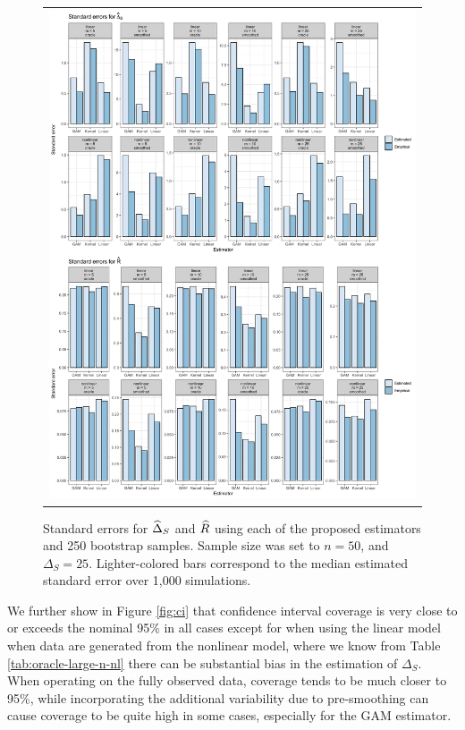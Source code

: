 \documentclass[useAMS,usenatbib,referee]{biom}
\begin{document}
\begin{figure}
\centering
\begin{tabular}{c}
\includegraphics[width =\textwidth]{results/standard-error-figure.png}
\end{tabular}\vspace{0.2in}
\caption{Standard errors for ${\widehat\Delta}_S$ and ${\widehat R}$ using each of the proposed estimators and 250 bootstrap samples. Sample size was set to $n = 50$, and $\Delta_S = 25$. Lighter-colored bars correspond to the median estimated standard error over 1,000 simulations.}\label{fig:se}
\end{figure}

We further show in Figure \ref{fig:ci} that confidence interval coverage is very close to or exceeds the nominal 95\% in all cases except for when using the linear model when data are generated from the nonlinear model, where we know from Table \ref{tab:oracle-large-n-nl} there can be substantial bias in the estimation of $\Delta_S$. When operating on the fully observed data, coverage tends to be much closer to 95\%, while incorporating the additional variability due to pre-smoothing can cause coverage to be quite high in some cases, especially for the GAM estimator. 
\end{document}
